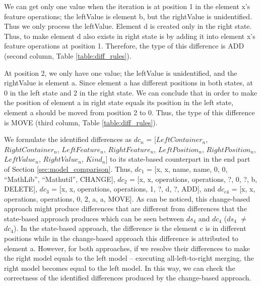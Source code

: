 \documentclass{jot}
\begin{document}
We can get only one value when the iteration is at position 1 in the element \textsf{x}'s feature \textsf{operations}; the \textsf{leftValue} is element \textsf{b}, but the \textsf{rightValue} is unidentified. Thus we only process the \textsf{leftValue}. Element \textsf{d} is created only in the right state. Thus, to make element \textsf{d} also exists in right state is by adding it into element \textsf{x}'s feature \textsf{operations} at position 1. Therefore, the type of this difference is \textsf{ADD} (second column, Table \ref{table:diff_rules}). 

At position 2, we only have one value; the \textsf{leftValue} is unidentified, and the \textsf{rightValue} is element \textsf{a}. Since element \textsf{a} has different positions in both states, at 0 in the left state and 2 in the right state. We can conclude that in order to make the position of element \textsf{a} in right state equals its position in the left state, element \textsf{a} should be moved from position 2 to 0. Thus, the type of this difference is \textsf{MOVE} (third column, Table \ref{table:diff_rules}).

We formulate the identified differences as $dc_{n}$ = [$LeftContainer_n$, $RightContainer_n$, $LeftFeature_n$, $RightFeature_n$, $LeftPosition_n$, $RightPosition_n$, $LeftValue_n$, $RightValue_n$, $Kind_n$] to its state-based counterpart in the end part of Section \ref{sec:model_comparison}. Thus, $dc_{1}$ =  [\textsf{x}, \textsf{x}, \textsf{name}, \textsf{name}, 0, 0, ``MathLib'', ``Mathutil'', \textsf{CHANGE}], $dc_{2}$ = [\textsf{x}, \textsf{x}, \textsf{operations}, \textsf{operations}, ?, 0, ?, \textsf{b}, \textsf{DELETE}], $dc_{3}$ = [\textsf{x}, \textsf{x}, \textsf{operations}, \textsf{operations}, 1, ?, \textsf{d}, ?, \textsf{ADD}], and $dc_{c4}$ = [\textsf{x}, \textsf{x}, \textsf{operations}, \textsf{operations}, 0, 2, \textsf{a}, \textsf{a}, \textsf{MOVE}]. As can be noticed, this change-based approach might produce differences that are different from differences that the state-based approach produces which can be seen between  $ds_{4}$ and $dc_{4}$ ($ds_{4}$ $\neq$ $dc_{4}$). In the state-based approach, the difference is the element \textsf{c} is in different positions while in the change-based approach this difference is attributed to element \textsf{a}. However, for both approaches, if we resolve their differences to make the right model equals to the left model -- executing all-left-to-right merging, the right model becomes equal to the left model. In this way, we can check the correctness of the identified differences produced by the change-based approach.
\end{document}

